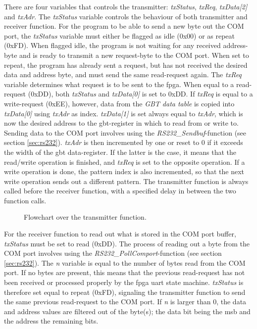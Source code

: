 \documentclass[main.tex]{subfiles}
\begin{document}
There are four variables that controls the transmitter: \textit{txStatus}, \textit{txReq}, \textit{txData[2]} and \textit{txAdr}. The \textit{txStatus} variable controls the behaviour of both transmitter and receiver function. For the program to be able to send a new byte out the COM port, the \textit{txStatus} variable must either be flagged as idle (0x00) or as repeat (0xFD). When flagged idle, the program is not waiting for any received address-byte and is ready to transmit a new request-byte to the COM port. When set to repeat, the program has already sent a request, but has not received the desired data and address byte, and must send the same read-request again. The \textit{txReq} variable determines what request is to be sent to the \gls{fpga}. When equal to a read-request (0xDD), both \textit{txStatus} and \textit{txData[0]} is set to 0xDD. If \textit{txReq} is equal to a write-request (0xEE), however, data from the \textit{GBT data table} is copied into \textit{txData[0]} using \textit{txAdr} as index. \textit{txData[1]} is set always equal to \textit{txAdr}, which is now the desired address to the \gls{gbt}-register in which to read from or write to. Sending data to the COM port involves using the \textit{RS232\_Sendbuf}-function (see section \ref{sec:rs232}). \textit{txAdr} is then incremented by one or reset to 0 if it exceeds the width of the \gls{gbt} data-register. If the latter is the case, it means that the read/write operation is finished, and \textit{txReq} is set to the opposite operation. If a write operation is done, the pattern index is also incremented, so that the next write operation sends out a different pattern. The transmitter function is always called before the receiver function, with a specified delay in between the two function calls. \\

\begin{figure}[H] %
\begin{center}
\resizebox{0.8\linewidth}{!}{}
\caption{Flowchart over the transmitter function.}
\label{fig:flowtx}
\end{center}
\end{figure}

For the receiver function to read out what is stored in the COM port buffer, \textit{txStatus} must be set to read (0xDD). The process of reading out a byte from the COM port involves using the \textit{RS232\_PollComport}-function (see section \ref{sec:rs232}). The \textit{n} variable is equal to the number of bytes read from the COM port. If no bytes are present, this means that the previous read-request has not been received or processed properly by the \gls{fpga} \gls{uart} state machine. \textit{txStatus} is therefore set equal to repeat (0xFD), signaling the transmitter function to send the same previous read-request to the COM port. If \textit{n} is larger than 0, the data and address values are filtered out of the byte(s); the data bit being the \gls{msb} and the address the remaining bits.
\end{document}
